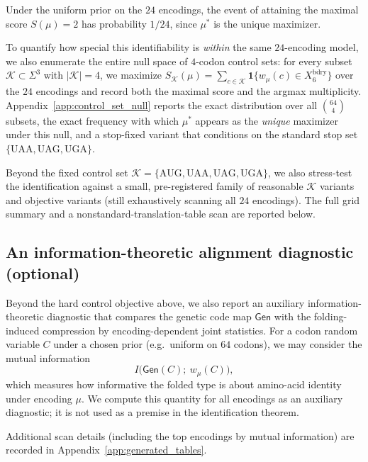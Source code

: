 \begin{remark}
Under the uniform prior on the $24$ encodings, the event of attaining the maximal score $S(\mu)=2$ has probability $1/24$, since $\mu^\ast$ is the unique maximizer.
\end{remark}

\begin{remark}\label{rem:control_set_null}
To quantify how special this identifiability is \emph{within} the same $24$-encoding model, we also enumerate the entire null space of $4$-codon control sets:
for every subset $\mathcal{K}\subset\Sigma^3$ with $|\mathcal{K}|=4$, we maximize $S_{\mathcal{K}}(\mu)=\sum_{c\in\mathcal{K}}\mathbf{1}\{w_\mu(c)\in X_6^{\mathrm{bdry}}\}$ over the $24$ encodings and record both the maximal score and the argmax multiplicity.
Appendix~\ref{app:control_set_null} reports the exact distribution over all $\binom{64}{4}$ subsets, the exact frequency with which $\mu^\ast$ appears as the \emph{unique} maximizer under this null, and a stop-fixed variant that conditions on the standard stop set $\{\mathrm{UAA,UAG,UGA}\}$.

\end{remark}

\begin{remark}
Beyond the fixed control set $\mathcal{K}=\{\mathrm{AUG,UAA,UAG,UGA}\}$, we also stress-test the identification against a small, pre-registered family of reasonable $\mathcal{K}$ variants and objective variants (still exhaustively scanning all $24$ encodings).
The full grid summary and a nonstandard-translation-table scan are reported below.

\end{remark}

\subsection{An information-theoretic alignment diagnostic (optional)}
\label{sec:mutual_information}

Beyond the hard control objective above, we also report an auxiliary information-theoretic diagnostic that compares the genetic code map $\mathsf{Gen}$ with the folding-induced compression by encoding-dependent joint statistics.
For a codon random variable $C$ under a chosen prior (e.g.\ uniform on $64$ codons), we may consider the mutual information
\[
I\bigl(\mathsf{Gen}(C);\ w_\mu(C)\bigr),
\]
which measures how informative the folded type is about amino-acid identity under encoding $\mu$.
We compute this quantity for all encodings as an auxiliary diagnostic; it is not used as a premise in the identification theorem.
\cite{CoverThomas2006}


Additional scan details (including the top encodings by mutual information) are recorded in Appendix~\ref{app:generated_tables}.

